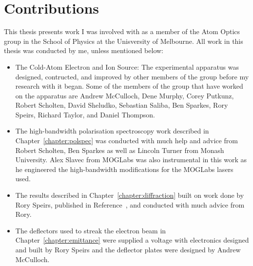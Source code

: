 \chapter*{Contributions}

This thesis presents work I was involved with as a member of the Atom Optics group in the School of Physics at the Unisversity of Melbourne.
All work in this thesis was conducted by me, unless mentioned below:
\begin{itemize}
\item The Cold-Atom Electron and Ion Source: The experimental apparatus was designed, contructed, and improved by other members of the group before my research with it began.
Some of the members of the group that have worked on the apparatus are
Andrew McCulloch, Dene Murphy, Corey Putkunz, Robert Scholten, David Sheludko, Sebastian Saliba, Ben Sparkes, Rory Speirs, Richard Taylor, and Daniel Thompson.
\item The high-bandwidth polarisation spectroscopy work described in Chapter~\ref{chapter:polspec} was conducted with much help and advice from Robert Scholten, Ben Sparkes as well as Lincoln Turner from Monash University. Alex Slavec from MOGLabs was also instrumental in this work as he engineered the high-bandwidth modifications for the MOGLabs lasers used.
\item The results described in Chapter~\ref{chapter:diffraction} built on work done by Rory Speirs, published in Reference~\cite{speirs_single-shot_2015}, and conducted with much advice from Rory.
\item The deflectors used to streak the electron beam in Chapter~\ref{chapter:emittance} were supplied a voltage with electronics designed and built by Rory Speirs and the deflector plates were designed by Andrew McCulloch.
\end{itemize}